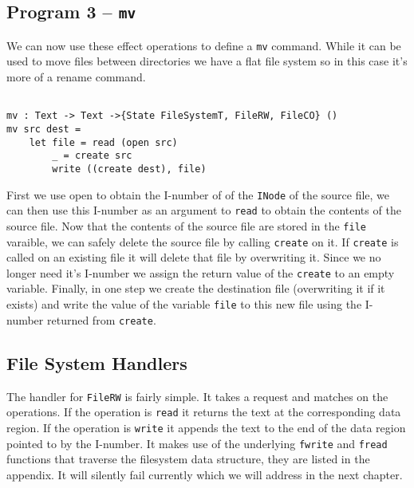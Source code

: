 \documentclass[logo,bsc,singlespacing,parskip]{infthesis}
\begin{document}
\begin{tcolorbox}[colback=gray!10, colframe=black, arc=0pt, outer arc=0pt]
  \section*{Program 3 -- \texttt{mv}}

  We can now use these effect operations to define a \texttt{mv} command. While
  it can be used to move files between directories we have a flat file system
  so in this case it's more of a rename command.

  \begin{lstlisting}[language=unison]

mv : Text -> Text ->{State FileSystemT, FileRW, FileCO} ()
mv src dest = 
    let file = read (open src)
        _ = create src
        write ((create dest), file)

  \end{lstlisting}

  First we use open to obtain the I-number of of the \texttt{INode} of the
  source file, we can then use this I-number as an argument to \texttt{read} to
  obtain the contents of the source file. Now that the contents of the source
  file are stored in the \texttt{file} varaible, we can safely delete the
  source file by calling \texttt{create} on it. If \texttt{create} is called on
  an existing file it will delete that file by overwriting it. Since we no
  longer need it's I-number we assign the return value of the \texttt{create}
  to an empty variable. Finally, in one step we create the destination file
  (overwriting it if it exists) and write the value of the variable
  \texttt{file} to this new file using the I-number returned from
  \texttt{create}.

\end{tcolorbox}

\subsection{File System Handlers}

The handler for \texttt{FileRW} is fairly simple. It takes a request and
matches on the operations. If the operation is \texttt{read} it returns the
text at the corresponding data region. If the operation is \texttt{write} it
appends the text to the end of the data region pointed to by the I-number.
It makes use of the underlying \texttt{fwrite} and \texttt{fread} functions
that traverse the filesystem data structure, they are listed in the appendix.
It will silently fail currently which we will address in the next chapter.
\end{document}
